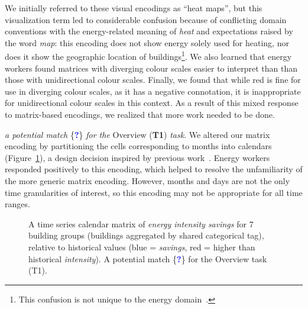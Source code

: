 \documentclass[journal]{vgtc}                %
\newcommand*\posmatch{\textcolor{blue}{{\bf ?}}}
\newcommand{\bstart}[1]{\vspace{1mm} \noindent{\textbf{#1:}}}
\begin{document}
We initially referred to these visual encodings as ``heat maps'', but this visualization term led to considerable confusion because of conflicting domain conventions with the energy-related meaning of {\it heat} and expectations raised by the word {\it map}: this encoding does not show energy solely used for heating, nor does it show the geographic location of buildings\footnote{This confusion is not unique to the energy domain~\cite{Field2015,Wilkinson2009}.}.
We also learned that energy workers found matrices with diverging colour scales easier to interpret than than those with unidirectional colour scales. 
Finally, we found that while red is fine for use in diverging colour scales, as it has a negative connotation, it is inappropriate for unidirectional colour scales in this context. 
As a result of this mixed response to matrix-based encodings, we realized that more work needed to be done.

\bstart{Calendar matrix} {\it a potential match} \{\posmatch\} {\it for the} Overview ({\bf T1}) {\it task}.
We altered our matrix encoding by partitioning the cells corresponding to months into calendars (Figure~\ref{fig:sandbox-calendar}), a design decision inspired by previous work~\cite{Lammarsch2009,vanWijk1999}. 
Energy workers responded positively to this encoding, which helped to resolve the unfamiliarity of the more generic matrix encoding. 
However, months and days are not the only time granularities of interest, so this encoding may not be appropriate for all time ranges.

\begin{figure}[ht]
	\centering
	\vspace{-0.15cm}
	\caption{A time series calendar matrix of \textsl{energy intensity savings} for 7 building groups (buildings aggregated by shared categorical tag), relative to historical values (blue = \textsl{savings}, red = higher than historical \textsl{intensity}). A potential match \{\posmatch\} for the Overview task (T1).}
	\label{fig:sandbox-calendar}
	\vspace{-0.6cm}
\end{figure}
\end{document}
